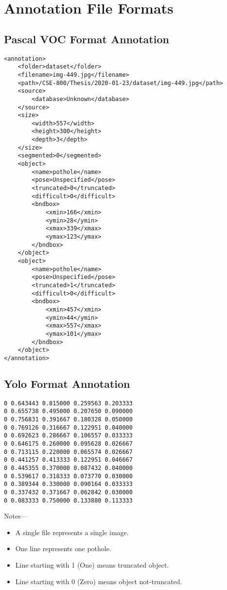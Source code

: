 \chapter{Annotation File Formats}
    \section{Pascal VOC Format Annotation}\label{app:af_voc}
        \begin{verbatim}
<annotation>
	<folder>dataset</folder>
	<filename>img-449.jpg</filename>
	<path>/CSE-800/Thesis/2020-01-23/dataset/img-449.jpg</path>
	<source>
		<database>Unknown</database>
	</source>
	<size>
		<width>557</width>
		<height>300</height>
		<depth>3</depth>
	</size>
	<segmented>0</segmented>
	<object>
		<name>pothole</name>
		<pose>Unspecified</pose>
		<truncated>0</truncated>
		<difficult>0</difficult>
		<bndbox>
			<xmin>166</xmin>
			<ymin>28</ymin>
			<xmax>339</xmax>
			<ymax>123</ymax>
		</bndbox>
	</object>
	<object>
		<name>pothole</name>
		<pose>Unspecified</pose>
		<truncated>1</truncated>
		<difficult>0</difficult>
		<bndbox>
			<xmin>457</xmin>
			<ymin>44</ymin>
			<xmax>557</xmax>
			<ymax>101</ymax>
		</bndbox>
	</object>
</annotation>
\end{verbatim}
    \section{Yolo Format Annotation}\label{app:af_yolo}
        \begin{verbatim}
0 0.643443 0.815000 0.259563 0.203333
0 0.655738 0.495000 0.207650 0.090000
0 0.756831 0.391667 0.180328 0.050000
0 0.769126 0.316667 0.122951 0.040000
0 0.692623 0.286667 0.106557 0.033333
0 0.646175 0.260000 0.095628 0.026667
0 0.713115 0.220000 0.065574 0.026667
0 0.441257 0.413333 0.122951 0.046667
0 0.445355 0.370000 0.087432 0.040000
0 0.539617 0.318333 0.073770 0.030000
0 0.389344 0.330000 0.090164 0.033333
0 0.337432 0.371667 0.062842 0.030000
0 0.083333 0.750000 0.133880 0.113333
\end{verbatim}
        \vfill
        Notes---
        \begin{itemize}
         \item A single file represents a single image.
         \item One line represents one pothole.
         \item Line starting with 1 (One) means truncated object.
         \item Line starting with 0 (Zero) means object not-truncated.
        \end{itemize}

